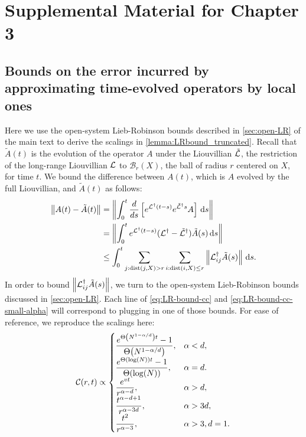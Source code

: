 \chapter{Supplemental Material for Chapter 3}
\section{Bounds on the error incurred by approximating time-evolved operators by local ones}
\label{app:sim-local-obs}

Here we use the open-system Lieb-Robinson bounds described in \cref{sec:open-LR} of the main text to derive the scalings in \cref{lemma:LRbound_truncated}.
Recall that $\tilde A(t)$ is the evolution of the operator $A$ under the Liouvillian $\tilde {\mathcal{L}}$, the restriction of the long-range Liouvillian $\mathcal{L}$ to $\mathcal{B}_r(X)$, the ball of radius $r$ centered on $X$, for time $t$.
We bound the difference between $A(t)$, which is $A$ evolved by the full Liouvillian, and $\tilde A(t)$ as follows:
\begin{align}
  \left\|A(t)-\tilde A(t)\right\|&= \left\|\int_0^t \frac{d}{ds} \left[e^{\mathcal{L} ^\dagger(t-s)} e^{\tilde {\mathcal{L}}^\dagger s} A\right]\,\text{d}s\right\| \\
  &= \left\| \int_0^t e^{\mathcal{L}^\dagger (t-s)} (\mathcal{L}^\dagger-\tilde{\mathcal{L}}^\dagger)\tilde A(s)\,\text{d}s\right\| \\
  &\le \int_0^t \sum_{j:\text{dist}(j,X)>r} \sum_{i:\text{dist}(i,X)\le r} \left\|\mathcal{L}^\dagger_{ij} \tilde A(s)\right\|\,\text{d}s. \label{eq:clustering-bound}
\end{align}
In order to bound $\left\|\mathcal{L}^\dagger_{ij} \tilde A(s)\right\|$, we turn to the open-system Lieb-Robinson bounds discussed in \cref{sec:open-LR}.
Each line of \cref{eq:LR-bound-cc} and \cref{eq:LR-bound-cc-small-alpha} will correspond to plugging in one of those bounds.
For ease of reference, we reproduce the scalings here:
\begin{equation}
		\label{app:LR-bound-cc}
		\mathcal C(r,t) \propto \begin{cases}
        \ds \frac{e^{\Th{N^{1-\al/d}}t}-1}{\Th{N^{1-\al/d}}},& \al < d,
        \\ \ds \frac{e^{\Th{\log(N)}t}-1}{\Th{\log(N)}},& \al= d.
		\\ \ds \frac{e^{vt}}{r^{\al-d}},& \al > d,
		\\ \ds \frac{t^{\alpha-d+1}}{r^{\alpha-3d}},& \al > 3d,
		\\ \ds \frac{t^2}{r^{\alpha-3}},& \al > 3, d=1.
	\end{cases}
\end{equation}
